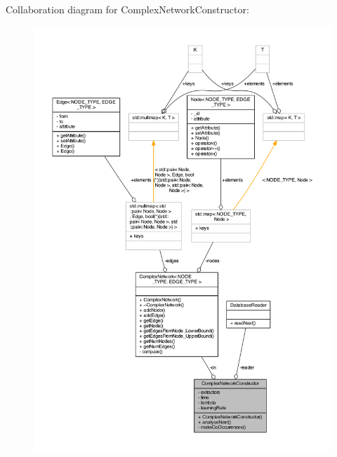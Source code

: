 Collaboration diagram for Complex\+Network\+Constructor\+:\nopagebreak
\begin{figure}[H]
\begin{center}
\leavevmode
\includegraphics[width=350pt]{class_complex_network_constructor__coll__graph}
\end{center}
\end{figure}


